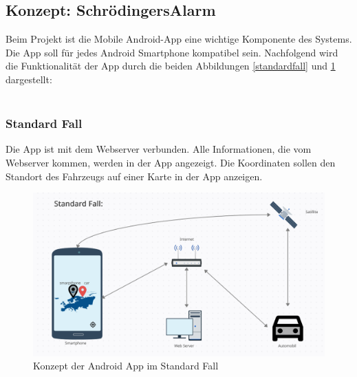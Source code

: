 \subsection{Konzept: SchrödingersAlarm}
Beim Projekt ist die Mobile Android-App eine wichtige Komponente des Systems. Die App soll für jedes Android Smartphone kompatibel sein. Nachfolgend wird die Funktionalität der App durch die beiden Abbildungen \ref{standardfall} und \ref{alarmfall} dargestellt:\\\\
\subsubsection{Standard Fall}
Die App ist mit dem Webserver verbunden. Alle Informationen, die vom Webserver kommen, werden in der App angezeigt. Die Koordinaten sollen den Standort des Fahrzeugs auf einer Karte in der App anzeigen.

\begin{figure}[H]
            \centering
            \includegraphics[width=1\textwidth]{Bilder/StandardFall.PNG}
            \caption{Konzept der Android App im Standard Fall}
            \label{alarmfall}
\end{figure}
